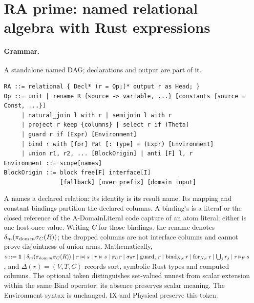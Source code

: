 \section{RA prime: named relational algebra with Rust expressions}
\label{sec:ra}

\paragraph{Grammar.} A standalone named DAG; declarations and output are part of it.
\begin{lstlisting}
RA ::= relational { Decl* (r = Op;)* output r as Head; }
Op ::= unit | rename R {source -> variable, ...} [constants {source = Const, ...}]
     | natural_join l with r | semijoin l with r
     | project r keep {columns} | select r if (Theta)
     | guard r if (Expr) [Environment]
     | bind r with [for] Pat [: Type] = (Expr) [Environment]
     | union r1, r2, ... [BlockOrigin] | anti [F] l, r
Environment ::= scope[names]
BlockOrigin ::= block free[F] interface[I]
                [fallback] [over prefix] [domain input]
\end{lstlisting}
A  names a declared relation; its identity is its result name.
Its mapping and constant bindings partition the declared columns. A binding's
 is a literal or the closed reference  of the
A-DomainLiteral code capture of an atom literal; either is one host-once value.
Writing
$C$ for those bindings, the rename denotes
$\delta_m(\pi_{\operatorname{dom} m}\sigma_C(R))$; the dropped columns are not interface columns
and cannot prove disjointness of union arms.
Mathematically,
$o::=\mathbf1\mid\delta_m(\pi_{\operatorname{dom} m}\sigma_C(R))\mid r\bowtie s\mid r\ltimes s\mid\pi_Ur\mid\sigma_\theta r
\mid\operatorname{guard}_er\mid\operatorname{bind}_{N,e}r
\mid\operatorname{for}_{N,e}r\mid\bigcup_jr_j\mid r\triangleright_Fs$,
and $\Delta(r)=(V,T,C)$ records sort, symbolic Rust types and computed columns.
The optional  token distinguishes set-valued unnest from scalar
extension within the same Bind operator; its absence preserves scalar meaning.
The Environment syntax is unchanged. IX and Physical preserve this token.

